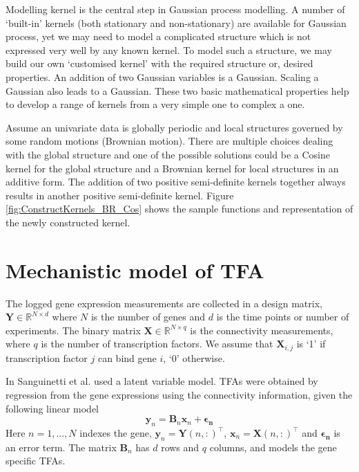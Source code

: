 Modelling kernel is the central step in Gaussian process modelling. A number of \lq built-in\rq{ }kernels (both stationary and non-stationary) are available for Gaussian process, yet we may need to model a complicated structure which is not expressed very well by any known kernel. To model such a structure, we may build our own \lq customised kernel\rq{ }with the required structure or, desired properties. An addition of two Gaussian variables is a Gaussian. Scaling a Gaussian also leads to a Gaussian. These two basic mathematical properties help to develop a range of kernels from a very simple one to complex a one. 

Assume an univariate data is globally periodic and local structures governed by some random motions (Brownian motion). There are multiple choices dealing with the global structure and one of the possible solutions could be a Cosine kernel for the global structure and a Brownian kernel for local structures in an additive form. The addition of two positive semi-definite kernels together always results in another positive semi-definite kernel. Figure \ref{fig:ConstructKernels_BR_Cos} shows the sample functions and representation of the newly constructed kernel.


\section{Mechanistic model of TFA}\label{sec:Probabilistic_TFA}
The logged gene expression measurements are collected in a design matrix, $\textbf{Y} \in \mathbb{R}^{ N \times d}$ where $N$ is the number of genes and $d$ is the time points or number of experiments. The binary matrix $\textbf{X} \in \mathbb{R} ^ {N \times q}$ is the connectivity measurements, where $q$ is the number of transcription factors. We assume that $\textbf{X}_{i,j}$ is \lq 1\rq{ }if transcription factor $j$ can bind gene $i$, \lq 0\rq{ }otherwise.

In \cite{Sanguinetti:2006} Sanguinetti et al. used a latent variable model. TFAs were obtained by regression from the gene expressions using the connectivity information, given the following linear model 
\begin{equation} \label{eq:linear_model_TFA}
\textbf{y}_n = \textbf{B}_n \textbf{x}_n + \boldsymbol{\epsilon_{n}}
\end{equation}
Here $n = 1, . . . ,N$ indexes the gene, $\textbf{y}_n =\textbf{Y}(n,:)^{\top}$, $\textbf{x}_n=\textbf{X}(n,:)^{\top}$ and $\boldsymbol{\epsilon_{n}}$ is an error term. The matrix $\textbf{B}_n$ has $d$ rows and $q$ columns, and models the gene specific TFAs.

